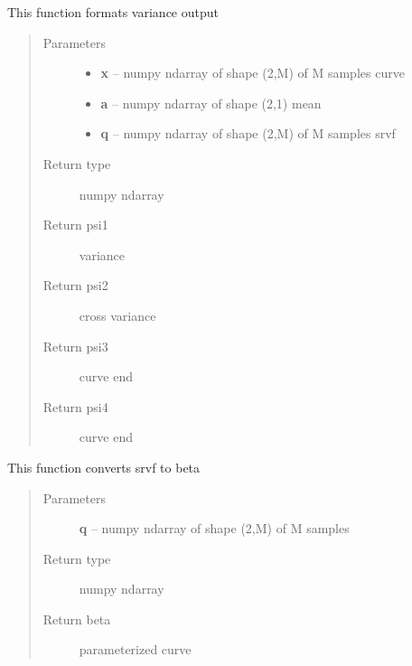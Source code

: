 \documentclass[letterpaper,10pt,english]{sphinxmanual}
\begin{document}
\begin{fulllineitems}
\label{curve_functions:curve_functions.psi}
This function formats variance output
\begin{quote}\begin{description}
\item[{Parameters}] \leavevmode\begin{itemize}
\item {} 
\textbf{x} -- numpy ndarray of shape (2,M) of M samples curve

\item {} 
\textbf{a} -- numpy ndarray of shape (2,1) mean

\item {} 
\textbf{q} -- numpy ndarray of shape (2,M) of M samples srvf

\end{itemize}

\item[{Return type}] \leavevmode
numpy ndarray

\item[{Return psi1}] \leavevmode
variance

\item[{Return psi2}] \leavevmode
cross variance

\item[{Return psi3}] \leavevmode
curve end

\item[{Return psi4}] \leavevmode
curve end

\end{description}\end{quote}

\end{fulllineitems}


\begin{fulllineitems}
\label{curve_functions:curve_functions.q_to_curve}
This function converts srvf to beta
\begin{quote}\begin{description}
\item[{Parameters}] \leavevmode
\textbf{q} -- numpy ndarray of shape (2,M) of M samples

\item[{Return type}] \leavevmode
numpy ndarray

\item[{Return beta}] \leavevmode
parameterized curve

\end{description}\end{quote}

\end{fulllineitems}
\end{document}

